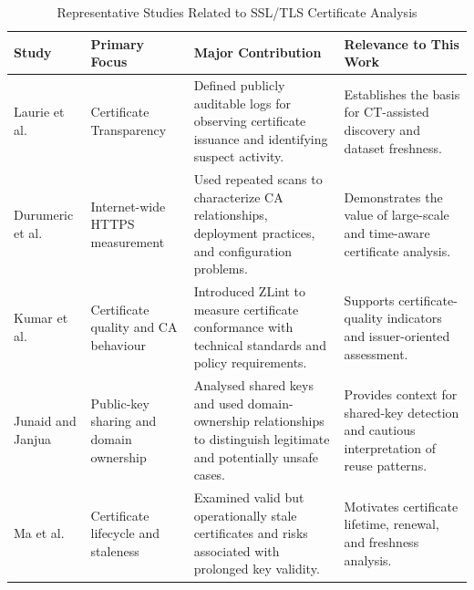 \begin{table}[H]
  \centering
  \caption{Representative Studies Related to SSL/TLS Certificate Analysis}
  \label{tab:related-work-comparison}
  \begingroup
  \scriptsize
  \renewcommand{\arraystretch}{1.08}
  \setlength{\tabcolsep}{3pt}
  \begin{tabularx}{\textwidth}{@{}>{\RaggedRight\arraybackslash}p{}>{\RaggedRight\arraybackslash}p{}>{\RaggedRight\arraybackslash}p{}>{\RaggedRight\arraybackslash}X@{}}
    \toprule
    \textbf{Study} & \textbf{Primary Focus} & \textbf{Major Contribution} & \textbf{Relevance to This Work} \\
    \midrule
    Laurie et al.~\cite{rfc9162}
    & Certificate Transparency
    & Defined publicly auditable logs for observing certificate issuance and identifying suspect activity.
    & Establishes the basis for CT-assisted discovery and dataset freshness. \\

    Durumeric et al.~\cite{durumeric2013https}
    & Internet-wide HTTPS measurement
    & Used repeated scans to characterize CA relationships, deployment practices, and configuration problems.
    & Demonstrates the value of large-scale and time-aware certificate analysis. \\

    Kumar et al.~\cite{kumar2018misissuance}
    & Certificate quality and CA behaviour
    & Introduced ZLint to measure certificate conformance with technical standards and policy requirements.
    & Supports certificate-quality indicators and issuer-oriented assessment. \\

    Junaid and Janjua~\cite{junaid2025shared}
    & Public-key sharing and domain ownership
    & Analysed shared keys and used domain-ownership relationships to distinguish legitimate and potentially unsafe cases.
    & Provides context for shared-key detection and cautious interpretation of reuse patterns. \\

    Ma et al.~\cite{ma2023stale}
    & Certificate lifecycle and staleness
    & Examined valid but operationally stale certificates and risks associated with prolonged key validity.
    & Motivates certificate lifetime, renewal, and freshness analysis. \\
    \bottomrule
  \end{tabularx}
  \endgroup
\end{table}

